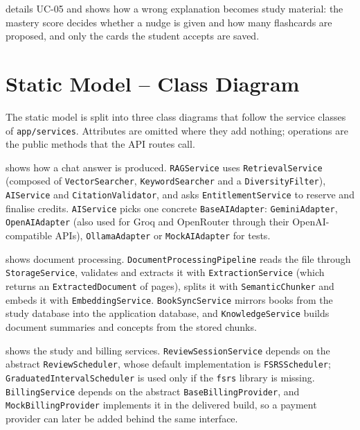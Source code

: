 
 details UC-05 and shows how a wrong explanation becomes study material:
the mastery score decides whether a nudge is given and how many flashcards are proposed, and
only the cards the student accepts are saved.


\section{Static Model -- Class Diagram}

The static model is split into three class diagrams that follow the service classes of
\texttt{app/services}. Attributes are omitted where they add nothing; operations are the public
methods that the API routes call.

 shows how a chat answer is produced. \texttt{RAGService} uses
\texttt{RetrievalService} (composed of \texttt{VectorSearcher}, \texttt{KeywordSearcher} and a
\texttt{DiversityFilter}), \texttt{AIService} and \texttt{CitationValidator}, and asks
\texttt{EntitlementService} to reserve and finalise credits. \texttt{AIService} picks one
concrete \texttt{BaseAIAdapter}: \texttt{GeminiAdapter}, \texttt{OpenAIAdapter} (also used for Groq
and OpenRouter through their OpenAI-compatible APIs), \texttt{OllamaAdapter} or
\texttt{MockAIAdapter} for tests.


 shows document processing. \texttt{DocumentProcessingPipeline} reads the
file through \texttt{StorageService}, validates and extracts it with \texttt{ExtractionService}
(which returns an \texttt{ExtractedDocument} of pages), splits it with \texttt{SemanticChunker} and
embeds it with \texttt{EmbeddingService}. \texttt{BookSyncService} mirrors books from the study
database into the application database, and \texttt{KnowledgeService} builds document summaries
and concepts from the stored chunks.


 shows the study and billing services. \texttt{ReviewSessionService}
depends on the abstract \texttt{ReviewScheduler}, whose default implementation is
\texttt{FSRSScheduler}; \texttt{GraduatedIntervalScheduler} is used only if the \texttt{fsrs}
library is missing. \texttt{BillingService} depends on the abstract \texttt{BaseBillingProvider},
and \texttt{MockBillingProvider} implements it in the delivered build, so a payment provider
can later be added behind the same interface.

